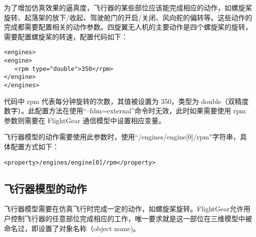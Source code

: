 \begin{enumerate}
为了增加仿真效果的逼真度，飞行器的某些部位应该能完成相应的动作，如螺旋桨旋转、起落架的放下/收起、驾驶舱门的开启/关闭、风向舵的偏转等。这些动作的完成都需要配置相关的动作参数。四旋翼无人机的主要动作是四个螺旋桨的旋转，需要配置螺旋桨的转速，配置代码如下：
\begin{lstlisting}[language={[ANSI]C++}]
<engines>
<engine>
   <rpm type="double">350</rpm>
</engine>
</engines>
\end{lstlisting}
代码中 rpm 代表每分钟旋转的次数，其值被设置为 350，类型为 double（双精度数字）。此配置方法在使用“--fdm=external”命令时无效，此时如果需要使用 rpm 参数则需要在 FlightGear 通信模型中设置相应变量。

飞行器模型的动作需要使用此参数时，使用“/engines/engine[0]/rpm”字符串，具体配置方式如下：
\begin{lstlisting}[language={[ANSI]C++}]
<property>/engines/engine[0]/rpm</property>
\end{lstlisting}
\end{enumerate}
\subsection{飞行器模型的动作}
飞行器模型需要在仿真飞行时完成一定的动作，如螺旋桨旋转。FlightGear允许用户控制飞行器的任意部位完成相应的工作，唯一要求就是这一部位在三维模型中被命名过，即设置了对象名称（object name)。

